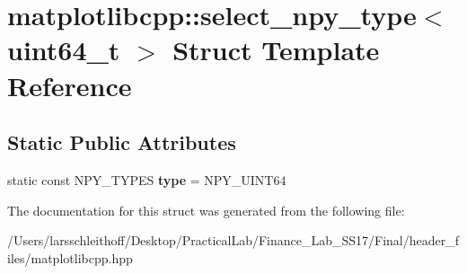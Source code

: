 \hypertarget{structmatplotlibcpp_1_1select__npy__type_3_01uint64__t_01_4}{}\section{matplotlibcpp\+:\+:select\+\_\+npy\+\_\+type$<$ uint64\+\_\+t $>$ Struct Template Reference}
\label{structmatplotlibcpp_1_1select__npy__type_3_01uint64__t_01_4}
\subsection*{Static Public Attributes}
\begin{DoxyCompactItemize}
\item 
\mbox{\label{structmatplotlibcpp_1_1select__npy__type_3_01uint64__t_01_4_a8d5871452f90ff04452f0416bee54fca}} 
static const N\+P\+Y\+\_\+\+T\+Y\+P\+ES {\bfseries type} = N\+P\+Y\+\_\+\+U\+I\+N\+T64
\end{DoxyCompactItemize}


The documentation for this struct was generated from the following file\+:\begin{DoxyCompactItemize}
\item 
/\+Users/larsschleithoff/\+Desktop/\+Practical\+Lab/\+Finance\+\_\+\+Lab\+\_\+\+S\+S17/\+Final/header\+\_\+files/matplotlibcpp.\+hpp\end{DoxyCompactItemize}
